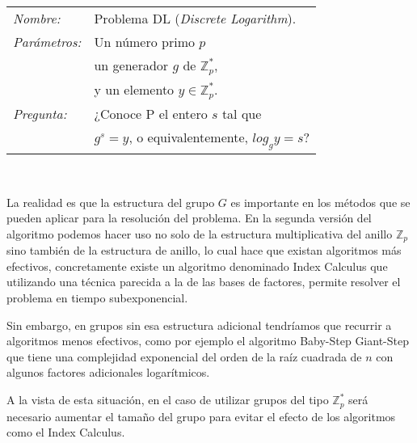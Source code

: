 \hfil

\begin{tabular}{|ll}
	\textit{Nombre:} & Problema DL (\textit{Discrete Logarithm}). \\
	\textit{Parámetros:} & Un n\'umero primo $p$ \\ & un generador $g$ de ${\mathbb Z}_p^*$,\\ & y un elemento $y\in {\mathbb Z}_p^*$. \\
	\textit{Pregunta:} & ¿Conoce P el entero $s$ tal que \\ & $g^s = y$, o equivalentemente, $log_g y = s$? \\
\end{tabular}
\\

\hfil

La realidad es que la estructura del grupo $G$ es importante en los m\'etodos que se pueden aplicar para la resoluci\'on del problema. En la segunda versi\'on del algoritmo
podemos hacer uso no solo de la estructura multiplicativa del anillo ${\mathbb Z}_p$ sino tambi\'en de la estructura de anillo, lo cual hace que existan algoritmos m\'as efectivos,
concretamente existe un algoritmo denominado Index Calculus que utilizando una t\'ecnica parecida a la de las bases de factores, permite resolver el problema en tiempo subexponencial.

Sin embargo, en grupos sin esa estructura adicional tendr\'iamos que recurrir a algoritmos menos efectivos, como por ejemplo el algoritmo Baby-Step Giant-Step que tiene una complejidad
exponencial del orden de la ra\'iz cuadrada de $n$ con algunos factores adicionales logar\'itmicos.

A la vista de esta situaci\'on, en el caso de utilizar grupos del tipo ${\mathbb Z}_p^*$ ser\'a necesario aumentar el tama\~no del grupo para evitar el efecto de los algoritmos
como el Index Calculus.
